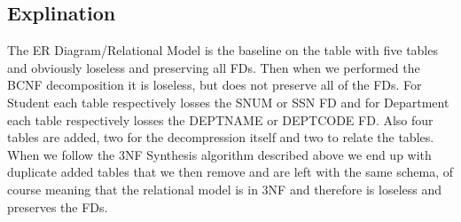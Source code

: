 \documentclass[12pt]{article}
\begin{document}
		\subsection{Explination}
			The ER Diagram/Relational Model is the baseline on the table with five tables and obviously loseless and preserving all FDs. Then when we performed the BCNF decomposition it is loseless, but does not preserve all of the FDs. For Student each table respectively losses the SNUM or SSN FD and for Department each table respectively losses the DEPTNAME or DEPTCODE FD. Also four tables are added, two for the decompression itself and two to relate the tables. When we follow the 3NF Synthesis algorithm described above we end up with duplicate added tables that we then remove and are left with the same schema, of course meaning that the relational model is in 3NF and therefore is loseless and preserves the FDs.
\end{document}
